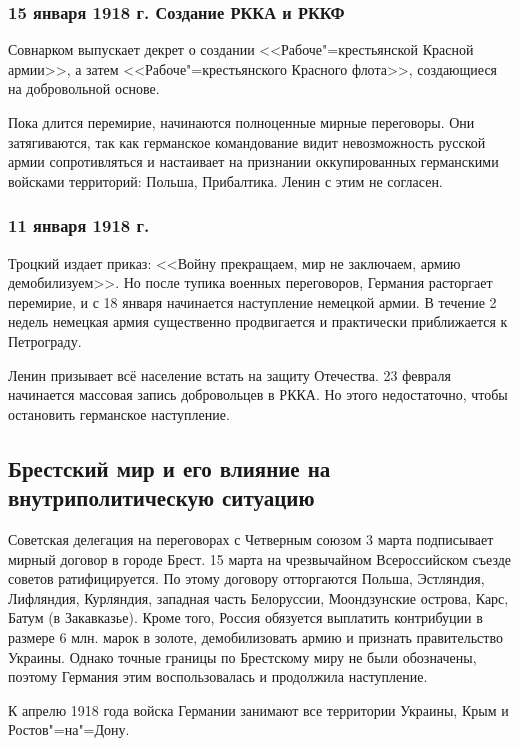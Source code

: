 \subsubsection{\textbf{15 января 1918 г. Создание РККА и РККФ}}

Совнарком выпускает декрет о создании <<Рабоче"=крестьянской Красной армии>>, а затем <<Рабоче"=крестьянского Красного флота>>, создающиеся на добровольной основе.

Пока длится перемирие, начинаются полноценные мирные переговоры. Они затягиваются, так как германское командование видит невозможность русской армии сопротивляться и настаивает на признании оккупированных германскими войсками территорий: Польша, Прибалтика. Ленин с этим не согласен.

\subsubsection{\textbf{11 января 1918 г.}}

Троцкий издает приказ: <<Войну прекращаем, мир не заключаем, армию демобилизуем>>. Но после тупика военных переговоров, Германия расторгает перемирие, и с 18 января начинается наступление немецкой армии. В течение 2 недель немецкая армия существенно продвигается и практически приближается к Петрограду.

Ленин призывает всё население встать на защиту Отечества. 23 февраля начинается массовая запись добровольцев в РККА. Но этого недостаточно, чтобы остановить германское наступление.

\subsection{Брестский мир и его влияние на внутриполитическую ситуацию}

Советская делегация на переговорах с Четверным союзом 3 марта подписывает мирный договор в городе Брест. 15 марта на чрезвычайном Всероссийском съезде советов ратифицируется. По этому договору отторгаются Польша, Эстляндия, Лифляндия, Курляндия, западная часть Белоруссии, Моондзунские острова, Карс, Батум (в Закавказье). Кроме того, Россия обязуется выплатить контрибуции в размере 6 млн. марок в золоте, демобилизовать армию и признать правительство Украины. Однако точные границы по Брестскому миру не были обозначены, поэтому Германия этим воспользовалась и продолжила наступление.

К апрелю 1918 года войска Германии занимают все территории Украины, Крым и Ростов"=на"=Дону.


